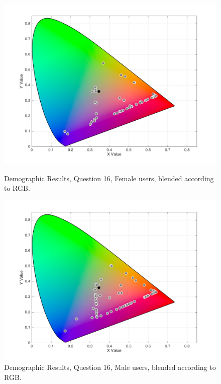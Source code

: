 \begin{figure}[!htbp]
  \centering
  \vspace{-10pt}
  \begin{minipage}{0.4\textwidth}
    \centering
    \includegraphics[width=\textwidth]{images/results/16_demo_genderF_RGBresponses.png}
    \caption[Demographic Results, Question 16, Female users, according to RGB.]{Demographic Results, Question 16, Female users, blended according to RGB.}
    \label{fig:gender_1}
  \end{minipage}
  \begin{minipage}{0.4\textwidth}
    \centering
    \includegraphics[width=\textwidth]{images/results/16_demo_genderM_RGBresponses.png}
    \caption[Demographic Results, Question 16, Male users, according to RGB.]{Demographic Results, Question 16, Male users, blended according to RGB.}
    \label{fig:gender_2}
  \end{minipage}
  \vspace{-10pt}
\end{figure}
%

